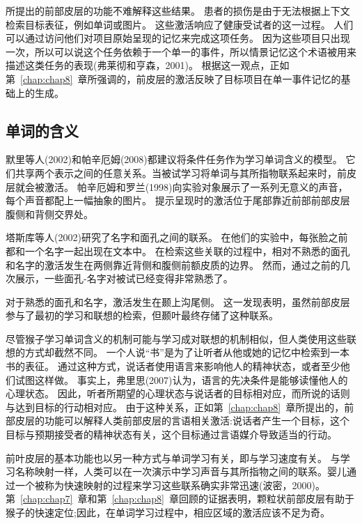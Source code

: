 所提出的前部皮层的功能不难解释这些结果。
患者的损伤是由于无法根据上下文检索目标表征，例如单词或图片。
这些激活响应了健康受试者的这一过程。
人们可以通过访问他们对项目原始呈现的记忆来完成这项任务。
因为这些项目只出现一次，所以可以说这个任务依赖于一个单一的事件，所以情景记忆这个术语被用来描述这类任务的表现(弗莱彻和亨森，2001)。
根据这一观点，正如第~\ref{chap:chap8}~章所强调的，前皮层的激活反映了目标项目在单一事件记忆的基础上的生成。
\par



\subsection{单词的含义}

默里等人(2002)和帕辛厄姆(2008)都建议将条件任务作为学习单词含义的模型。
它们共享两个表示之间的任意关系。当被试学习将单词与其所指物联系起来时，前皮层就会被激活。
帕辛厄姆和罗兰(1998)向实验对象展示了一系列无意义的声音，每个声音都配上一幅抽象的图片。
提示呈现时的激活位于尾部靠近前部前部皮层腹侧和背侧交界处。
\par


塔斯库等人(2002)研究了名字和面孔之间的联系。
在他们的实验中，每张脸之前都和一个名字一起出现在文本中。
在检索这些关联的过程中，相对不熟悉的面孔和名字的激活发生在两侧靠近背侧和腹侧前额皮质的边界。
然而，通过之前的几次展示，一些面孔-名字对被试已经变得非常熟悉了。
\par


对于熟悉的面孔和名字，激活发生在颞上沟尾侧。
这一发现表明，虽然前部皮层参与了最初的学习和联想的检索，但颞叶最终存储了这种联系。
\par

尽管猴子学习单词含义的机制可能与学习成对联想的机制相似，但人类使用这些联想的方式却截然不同。
一个人说“书”是为了让听者从他或她的记忆中检索到一本书的表征。
通过这种方式，说话者使用语言来影响他人的精神状态，或者至少他们试图这样做。
事实上，弗里思(2007)认为，语言的先决条件是能够读懂他人的心理状态。
因此，听者所期望的心理状态与说话者的目标相对应，而所说的话则与达到目标的行动相对应。
由于这种关系，正如第~\ref{chap:chap8}~章所提出的，前部皮层的功能可以解释人类前部皮层的言语相关激活:说话者产生一个目标，这个目标与预期接受者的精神状态有关，这个目标通过言语媒介导致适当的行动。
\par


前叶皮层的基本功能也以另一种方式与单词学习有关，即与学习速度有关。
与学习名称映射一样，人类可以在一次演示中学习声音与其所指物之间的联系。婴儿通过一个被称为快速映射的过程来学习这些联系确实非常迅速(波密，2000)。
第~\ref{chap:chap7}~章和第~\ref{chap:chap8}~章回顾的证据表明，颗粒状前部皮层有助于猴子的快速定位;因此，在单词学习过程中，相应区域的激活应该不足为奇。




